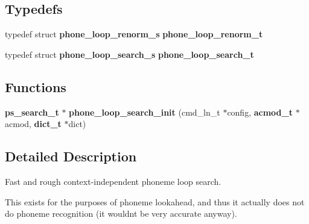 \subsection*{Typedefs}
\begin{DoxyCompactItemize}
\item 
\mbox{\label{phone__loop__search_8h_a313734607dd312343fd138ccc32b9228}} 
typedef struct \textbf{ phone\+\_\+loop\+\_\+renorm\+\_\+s} {\bfseries phone\+\_\+loop\+\_\+renorm\+\_\+t}
\item 
\mbox{\label{phone__loop__search_8h_aff0f48051fd9e2725230896875887aa2}} 
typedef struct \textbf{ phone\+\_\+loop\+\_\+search\+\_\+s} {\bfseries phone\+\_\+loop\+\_\+search\+\_\+t}
\end{DoxyCompactItemize}
\subsection*{Functions}
\begin{DoxyCompactItemize}
\item 
\mbox{\label{phone__loop__search_8h_a2308707c1a22ea9b0495f6c7f151f806}} 
\textbf{ ps\+\_\+search\+\_\+t} $\ast$ {\bfseries phone\+\_\+loop\+\_\+search\+\_\+init} (cmd\+\_\+ln\+\_\+t $\ast$config, \textbf{ acmod\+\_\+t} $\ast$acmod, \textbf{ dict\+\_\+t} $\ast$dict)
\end{DoxyCompactItemize}


\subsection{Detailed Description}
Fast and rough context-\/independent phoneme loop search. 

This exists for the purposes of phoneme lookahead, and thus it actually does not do phoneme recognition (it wouldn\textquotesingle{}t be very accurate anyway). 